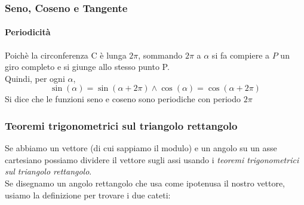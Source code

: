 \documentclass[12pt, a4paper, openany]{book}
\begin{document}
\subsubsection*{Seno, Coseno e Tangente}
\paragraph*{Periodicità}
Poichè la circonferenza C è lunga $2\pi$, sommando $2\pi$ a $\alpha$ si fa compiere a $P$
un giro completo e si giunge allo stesso punto P. 
\\Quindi, per ogni $\alpha$,
\[\sin(\alpha) = \sin(\alpha + 2\pi) \wedge \cos(\alpha) = \cos(\alpha+2\pi)\]
Si dice che le funzioni seno e coseno sono periodiche con periodo $2\pi$

\subsubsection*{Teoremi trigonometrici sul triangolo rettangolo}
Se abbiamo un vettore (di cui sappiamo il modulo) e un angolo su un asse cartesiano possiamo dividere il vettore sugli assi usando i
\emph{teoremi trigonometrici sul triangolo rettangolo}.
\\Se disegnamo un angolo rettangolo che usa come ipotenusa il nostro vettore, usiamo la definizione per trovare i due cateti:
\end{document}
